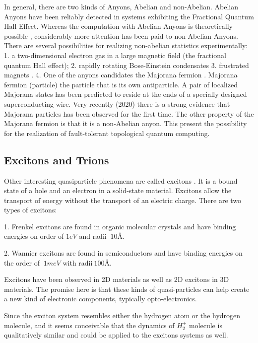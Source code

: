In general, there are two kinds of Anyons, Abelian and non-Abelian. Abelian Anyons have been reliably detected in systems exhibiting the Fractional Quantum Hall Effect\cite{FQHE}.  Whereas the computation with Abelian Anyons is theoretically possible \cite{AbelianAnyons}, considerably more attention has been paid to non-Abelian Anyons.
There are several possibilities for realizing non-abelian statistics experimentally: 1. a two-dimensional electron gas in a large magnetic field (the fractional quantum Hall effect); 2. rapidly rotating Bose-Einstein condensates\cite{RrBeC} 3. frustrated magnets \cite{FrMag}.
4.
One of the anyons candidates the Majorana fermion \cite{Majorana}. Majorana fermion (particle) the particle that is its own antiparticle. A pair of localized Majorana states has been predicted to reside at the ends of a specially designed superconducting wire.  Very recently (2020) \cite{Manna8775}
there is a strong evidence that Majorana particles has been observed for the first time. The other property of the Majorana fermion is that it is a non-Abelian anyon.
This present the possibility for the realization of fault-tolerant topological quantum computing\cite{AnyonsTqc}. 

\subsection*{Excitons and Trions}
Other interesting quasiparticle phenomena are called excitons \cite{Excitons2D1}. It is a bound state of a hole and an electron in a solid-state material. Excitons allow the transport of energy without the transport of an electric charge. There are two types of excitons: 

1. Frenkel excitons are found in organic molecular crystals\cite{Excitons3} and have binding energies on
order of $ 1eV $ and radii $ ~ 10\text{\AA} $.  


2. Wannier excitons are found in semiconductors\cite{Excitons2} and have binding energies on the order of $ ~1 meV $ with radii$ ~100\text{\AA}. $


Excitons have been observed in 2D materials\cite{Excitons2D2} as
well as 2D excitons in 3D materials. The promise here is that these kinds of quasi-particles can help create a new kind of electronic components, typically opto-electronics.

Since the exciton system resembles either the hydrogen atom or the hydrogen molecule, and it seems conceivable that the dynamics of  $ H_2^{+} $ molecule is qualitatively similar and could be applied to the excitons systems as well.

